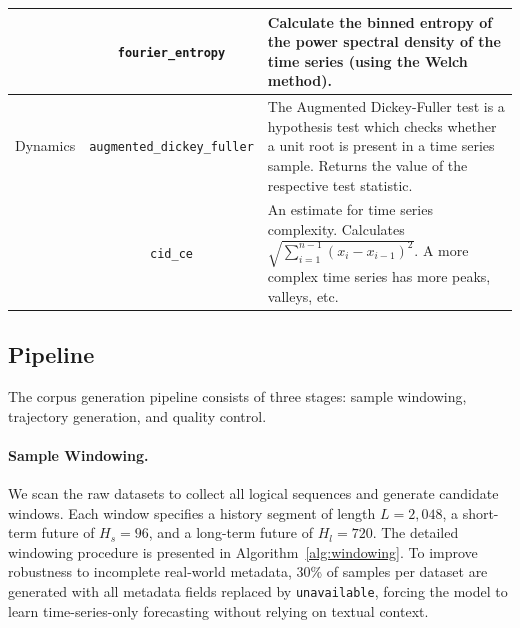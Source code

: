 \documentclass[11pt]{article}
\begin{document}
\begin{table}[htbp]
{\begin{tabular}{ccp{14cm}}
  & \texttt{fourier\_entropy} & Calculate the binned entropy of the power spectral density of the time series (using the Welch method). \\
\midrule
Dynamics
  & \texttt{augmented\_dickey\_fuller} & The Augmented Dickey-Fuller test is a hypothesis test which checks whether a unit root is present in a time series sample. Returns the value of the respective test statistic. \\
  & \texttt{cid\_ce} & An estimate for time series complexity. Calculates $\sqrt{\sum_{i=1}^{n-1}(x_{i} - x_{i-1})^2}$. A more complex time series has more peaks, valleys, etc. \\
\bottomrule
\end{tabular}
}
\end{table}

\subsection{Pipeline}
\label{app:qc}

The corpus generation pipeline consists of three stages: sample windowing, trajectory generation, and quality control.

\paragraph{Sample Windowing.}
We scan the raw datasets to collect all logical sequences and generate candidate windows.
Each window specifies a history segment of length $L{=}2{,}048$, a short-term future of $H_s{=}96$, and a long-term future of $H_l{=}720$.
The detailed windowing procedure is presented in Algorithm~\ref{alg:windowing}.
To improve robustness to incomplete real-world metadata, 30\% of samples per dataset are generated with all metadata fields replaced by \texttt{unavailable}, forcing the model to learn time-series-only forecasting without relying on textual context.
\end{document}
